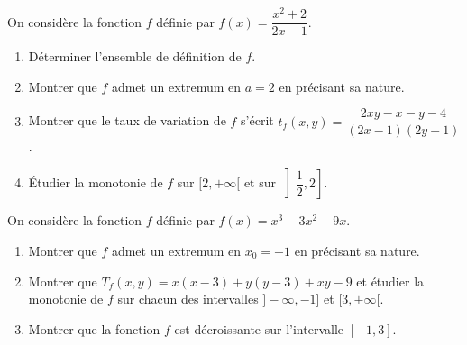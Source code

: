 \fin
{}
On considère la fonction $f$ définie par $f(x)=\dfrac{x^2+2}{2x-1}$.
\begin{enumerate}
\item Déterminer l'ensemble de définition de $f$.
\item Montrer que $f$ admet un extremum en $a=2$ en précisant sa nature.
\item Montrer que le taux de variation de $f$ s'écrit $t_f(x,y)=\dfrac{2xy-x-y-4}{(2x-1)(2y-1)}$.
\item Étudier la monotonie de $f$ sur $[2,+\infty[$ et sur $\left]\dfrac12,2\right]$.
\end{enumerate}
\fin
{}
On considère la fonction $f$ définie par $f(x)=x^3-3x^2-9x$.
\begin{enumerate}
\item Montrer que $f$ admet un extremum en $x_0=-1$ en précisant sa nature.
\item Montrer que $T_f(x,y)=x(x-3)+y(y-3)+xy-9$ et étudier la monotonie de $f$ sur chacun des intervalles $]-\infty,-1]$ et $[3,+\infty[$.
\item Montrer que la fonction $f$ est décroissante sur l'intervalle $[-1,3]$.
\end{enumerate}
\fin
